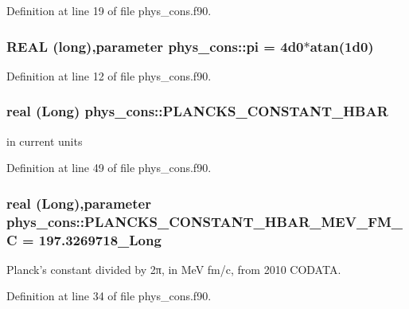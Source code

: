 Definition at line 19 of file phys\_\-cons.f90.

\hypertarget{namespacephys__cons_aae3c6cb8ae765b0262bb110ff739ba9d}{
\subsubsection[{pi}]{\setlength{\rightskip}{0pt plus 5cm}REAL (long),parameter {\bf phys\_\-cons::pi} = 4d0$\ast$atan(1d0)}}
\label{namespacephys__cons_aae3c6cb8ae765b0262bb110ff739ba9d}


Definition at line 12 of file phys\_\-cons.f90.

\hypertarget{namespacephys__cons_af0b754235993060b14fc81b7d1f702a5}{
\subsubsection[{PLANCKS\_\-CONSTANT\_\-HBAR}]{\setlength{\rightskip}{0pt plus 5cm}real (Long) {\bf phys\_\-cons::PLANCKS\_\-CONSTANT\_\-HBAR}}}
\label{namespacephys__cons_af0b754235993060b14fc81b7d1f702a5}


in current units 



Definition at line 49 of file phys\_\-cons.f90.

\hypertarget{namespacephys__cons_aed64b5904d4665ea8272a82b187b78c9}{
\subsubsection[{PLANCKS\_\-CONSTANT\_\-HBAR\_\-MEV\_\-FM\_\-C}]{\setlength{\rightskip}{0pt plus 5cm}real (Long),parameter {\bf phys\_\-cons::PLANCKS\_\-CONSTANT\_\-HBAR\_\-MEV\_\-FM\_\-C} = 197.3269718\_\-Long}}
\label{namespacephys__cons_aed64b5904d4665ea8272a82b187b78c9}


Planck's constant divided by 2π, in MeV fm/c, from 2010 CODATA. 



Definition at line 34 of file phys\_\-cons.f90.

